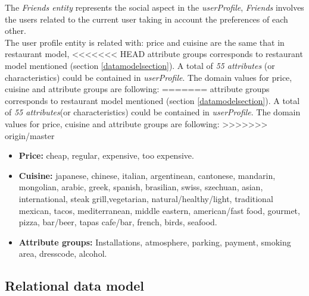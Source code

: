 The \textit{Friends entity}
represents the social aspect in the \textit{userProfile}, \textit{Friends} involves
the users related to the current user taking in account the
preferences of each other. \\The user profile entity is related with: 
price and cuisine are the same that in restaurant model,
<<<<<<< HEAD
attribute groups corresponds to restaurant model mentioned 
(section  \ref{datamodelsection}). A total of \textit{55 attributes}
(or characteristics)  could be contained in \textit{userProfile}. 
The domain values for price,  cuisine and attribute groups are following:
=======
attribute groups corresponds to restaurant model mentioned (section
\ref{datamodelsection}). A total of \textit{55 attributes}(or characteristics) 
could be contained in \textit{userProfile}. The domain values for price, 
cuisine and attribute groups are following:
>>>>>>> origin/master
\begin{itemize}
\item \textbf{Price:} cheap, regular, expensive, too expensive.
\item \textbf{Cuisine:} japanese, chinese, italian, argentinean,
cantonese, mandarin, mongolian, arabic, greek, spanish, brasilian,
swiss, szechuan, asian, international, steak grill,vegetarian,
natural/healthy/light, traditional mexican, tacos, mediterranean,
middle eastern, american/fast food, gourmet, pizza, bar/beer, tapas
cafe/bar, french, birds, seafood.
\item  \textbf{Attribute groups:} Installations, atmosphere, 
parking, payment, smoking area, dresscode, alcohol.
\end{itemize}

\subsection{Relational data model} 


